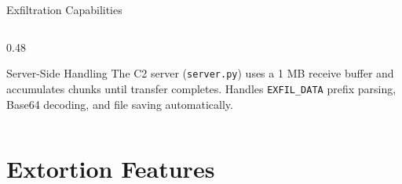 \documentclass[aspectratio=169]{beamer}
\newcommand{\code}[1]{\texttt{\textcolor{primaryblue}{#1}}}
\begin{document}
\begin{frame}{Exfiltration Capabilities}
\begin{columns}[T]
\begin{column}{0.48\textwidth}
      \vspace{0.3em}
      \begin{infobox}{Server-Side Handling}
        The C2 server (\code{server.py}) uses a 1 MB receive buffer and accumulates chunks until transfer completes. Handles \code{EXFIL\_DATA} prefix parsing, Base64 decoding, and file saving automatically.
      \end{infobox}
    \end{column}
  \end{columns}
\end{frame}

\section{Extortion Features}
\end{document}

